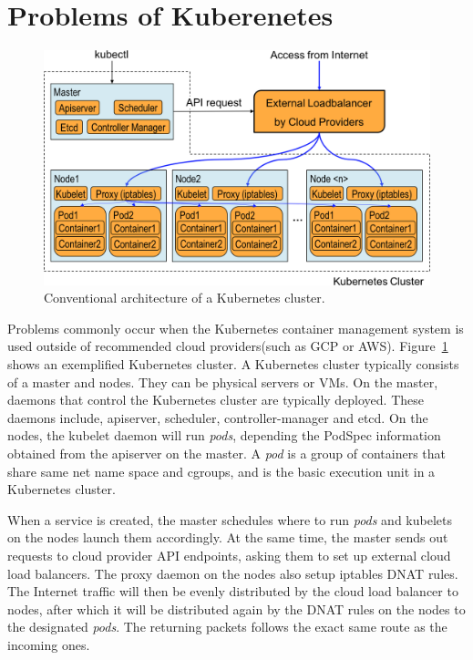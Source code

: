 \section{Problems of Kuberenetes}

\begin{figure}
  \centering
  \includegraphics[width=0.8\columnwidth]{Figs/K8sConventional}
  \caption{Conventional architecture of a Kubernetes cluster.}
  \label{fig:K8sConventional}
\end{figure}

Problems commonly occur when the Kubernetes container management system is used outside of recommended cloud providers(such as GCP or AWS).
Figure~\ref{fig:K8sConventional} shows an exemplified Kubernetes cluster.
A Kubernetes cluster typically consists of a master and nodes. They can be physical servers or VMs.
On the master, daemons that control the Kubernetes cluster are typically deployed. 
These daemons include, apiserver, scheduler, controller-manager and etcd. 
On the nodes, the kubelet daemon will run {\it pods}, depending the PodSpec information obtained from the apiserver on the master.
A {\em pod} is a group of containers that share same net name space and cgroups, 
and is the basic execution unit in a Kubernetes cluster.

When a service is created, the master schedules where to run {\em pods} and kubelets on the nodes launch them accordingly.
At the same time, the master sends out requests to cloud provider API endpoints, asking them to set up external cloud load balancers.
The proxy daemon on the nodes also setup iptables DNAT\cite{MartinA.Brown2017} rules. 
The Internet traffic will then be evenly distributed by the cloud load balancer to nodes, 
after which it will be distributed again by the DNAT rules on the nodes to the designated {\em pods}. 
The returning packets follows the exact same route as the incoming ones.

